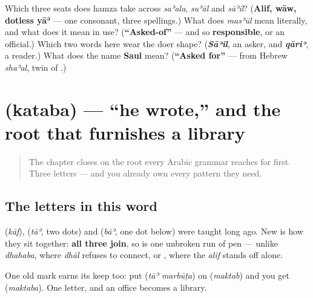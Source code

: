\begin{tcolorbox}[breakable,colback=teal!4,colframe=teal!35!black,title={Before you move on}]
Which three seats does hamza take across \emph{saʾala}, \emph{suʾāl} and \emph{sāʾil}? (\textbf{Alif, wāw, dotless yāʾ} — one consonant, three spellings.) What does \emph{masʾūl} mean literally, and what does it mean in use? (\textbf{\textquotedblleft{}Asked-of\textquotedblright{}} — and so \textbf{responsible}, or an official.) Which two words here wear the doer shape? (\emph{\textbf{Sāʾil}}, an asker, and \emph{\textbf{qāriʾ}}, a reader.) What does the name \textbf{Saul} mean? (\textbf{\textquotedblleft{}Asked for\textquotedblright{}} — from Hebrew \emph{shaʾal}, twin of \textbf{}.)
\end{tcolorbox}
\section[\texorpdfstring{\ar{كتب} (kataba)}{كتب (kataba)}]{ (kataba) — \textquotedblleft{}he wrote,\textquotedblright{} and the root that furnishes a library}

\label{lesson:AR-C31-kataba}



\begin{quote}
The chapter closes on the root every Arabic grammar reaches for first. Three letters — and you already own every pattern they need.
\end{quote}

\subsection*{The letters in this word}
\textbf{} (\emph{kāf}), \textbf{} (\emph{tāʾ}, two dots) and \textbf{} (\emph{bāʾ}, one dot below) were taught long ago. New is how they sit together: \textbf{all three join}, so \textbf{} is one unbroken run of pen — unlike \emph{dhahaba}, where \emph{dhāl} refuses to connect, or \textbf{}, where the \emph{alif} stands off alone.

One old mark earns its keep too: put \textbf{} (\emph{tāʾ marbūṭa}) on \textbf{} (\emph{maktab}) and you get \textbf{} (\emph{maktaba}). One letter, and an office becomes a library.

